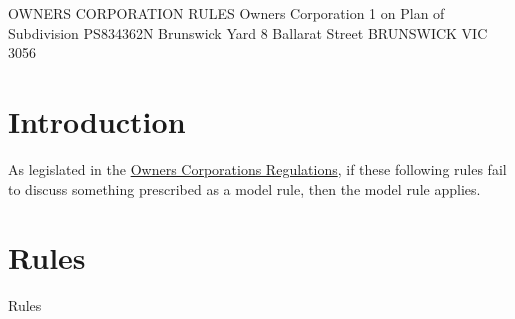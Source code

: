 \documentclass{article}
\begin{document}
OWNERS CORPORATION RULES Owners Corporation 1 on Plan of Subdivision PS834362N Brunswick Yard 8 Ballarat Street BRUNSWICK VIC 3056
\newpage

\section[intro]{Introduction}
As legislated in the \href{https://www.consumer.vic.gov.au/housing/owners-corporations/rules/model-rules#:~:text=The%20Model%20rules%20for%20an%20owners%20corporation%20%28Word%2C,the%20model%20rules%2C%20then%20the%20model%20rule%20applies.}{Owners Corporations Regulations}, if these following rules fail to discuss something prescribed as a model rule, then the model rule applies.

\newpage

\section[rules]{Rules}
Rules
\end{document}
